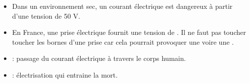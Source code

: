\begin{mybilan}
	\begin{itemize}
		\item Dans un environnement sec, un courant électrique est dangereux à partir d'une tension de 50 V.\pause
		
		\item En France, une prise électrique fournit une tension de . Il ne faut pas toucher toucher les bornes d'une prise car cela pourrait provoquer une  voire une .\pause
				 
	\end{itemize}

\end{mybilan}

\begin{mydefs}
	\begin{itemize}
		\item {} : passage du courant électrique à travers le corps humain. 
		
		\item {} : \'electrisation qui entraine la mort.
	\end{itemize}
\end{mydefs}